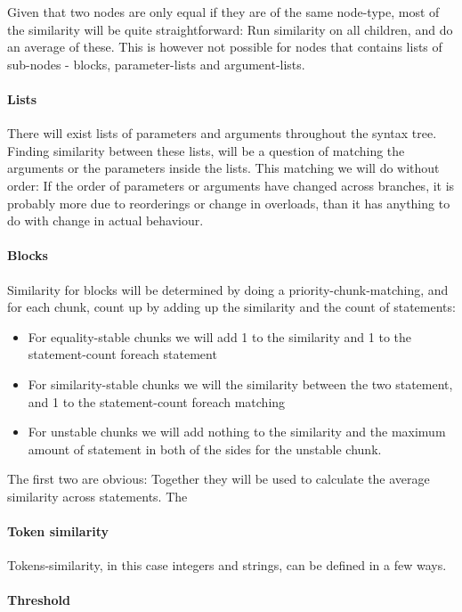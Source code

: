 \documentclass[11pt]{article}
\begin{document}
Given that two nodes are only equal if they are of the same node-type, most of the similarity will be quite straightforward: Run similarity on all children, and do an average of these. This is however not possible for nodes that contains lists of sub-nodes - blocks, parameter-lists and argument-lists.

\paragraph{Lists} There will exist lists of parameters and arguments throughout the syntax tree. Finding similarity between these lists, will be a question of matching the arguments or the parameters inside the lists. This matching we will do without order: If the order of parameters or arguments have changed across branches, it is probably more due to reorderings or change in overloads, than it has anything to do with change in actual behaviour.

\paragraph{Blocks} Similarity for blocks will be determined by doing a priority-chunk-matching, and for each chunk, count up by adding up the similarity and the count of statements:

\begin{itemize}
	\item For equality-stable chunks we will add 1 to the similarity and 1 to the statement-count foreach statement
	\item For similarity-stable chunks we will the similarity between the two statement, and 1 to the statement-count foreach matching
	\item For unstable chunks we will add nothing to the similarity and the maximum amount of statement in both of the sides for the unstable chunk.
\end{itemize}

The first two are obvious: Together they will be used to calculate the average similarity across statements. The 

\paragraph{Token similarity} Tokens-similarity, in this case integers and strings, can be defined in a few ways. 

\paragraph{Threshold}
\end{document}
